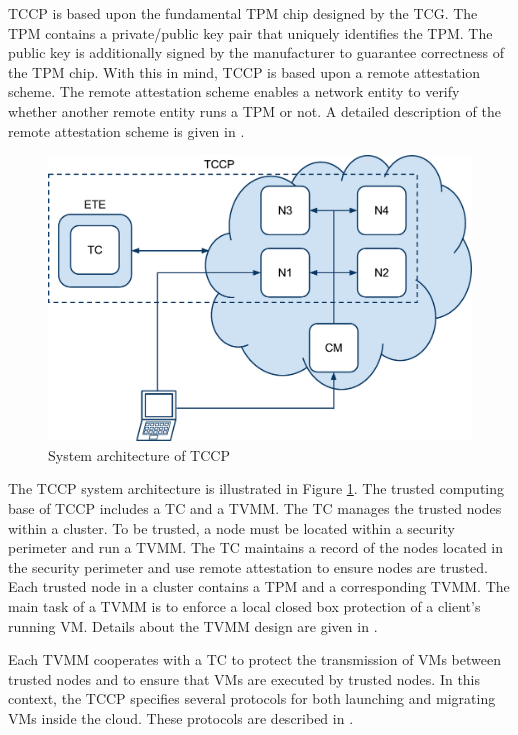 \documentclass[pdftex,english,10pt,b5paper,twoside]{book}
\begin{document}
TCCP is based upon the fundamental TPM chip designed by the TCG. The TPM
contains a private/public key pair that uniquely identifies the TPM. The public
key is additionally signed by the manufacturer to guarantee correctness of
the TPM chip. With this in mind, TCCP is based upon a remote attestation scheme.
The remote attestation scheme enables a network entity to verify whether another
remote entity runs a TPM or not. A detailed description of the remote
attestation scheme is given in \cite{tccp}.
\begin{figure}[h!]
    \centering
    \includegraphics[scale=0.4]{ArchitectureTCCP.pdf}
    \caption{System architecture of TCCP}
    \label{fig:RW:TCCP}
\end{figure}
The TCCP system architecture is illustrated in Figure \ref{fig:RW:TCCP}. The
trusted computing base of TCCP includes a \ac{TC} and a \ac{TVMM}. The TC
manages the trusted nodes within a cluster. To be trusted, a node must be
located within a security perimeter and run a TVMM. The TC maintains a record of
the nodes located in the security perimeter and use remote attestation to ensure
nodes are trusted. Each trusted node in a cluster contains a TPM and a
corresponding TVMM. The main task of a TVMM is to enforce a local closed box
protection of a client's running VM. Details about the TVMM design are given in
\cite{tvmm}. 

Each TVMM cooperates with a TC to protect the transmission of VMs between
trusted nodes and to ensure that VMs are executed by trusted nodes. In this
context, the TCCP specifies several protocols for both launching and migrating
VMs inside the cloud. These protocols are described in \cite{tccp}.
\end{document}
